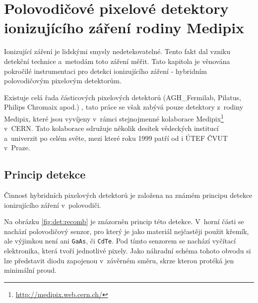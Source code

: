 

\chapter{Polovodičové pixelové detektory ionizujícího záření rodiny Medipix}\label{det}
Ionizující záření je lidskými smysly nedetekovatelné. Tento fakt dal vzniku detekční technice a~metodám toto záření měřit. Tato kapitola je věnována pokročilé instrumentaci pro detekci ionizujícího záření  - hybridním polovodičovým pixelovým detektorům.

Existuje celá řada částicových pixelových detektorů (AGH\_Fermilab, Pilatus, Philips Chromaix apod.) \cite{detectors_review}, tato práce se však zabývá pouze detektory z~rodiny Medipix, které jsou vyvíjeny v~rámci stejnojmenné kolaborace Medipix\footnote{\url{http://medipix.web.cern.ch/}} v~CERN. Tato kolaborace sdružuje několik desítek vědeckých institucí a~univerzit po celém světe, mezi které roku 1999 patří od i ÚTEF ČVUT v~Praze.


\clearpage

\section{Princip detekce}
Činnost hybridních pixelových detektorů je založena na známém principu detekce ionizujícího záření v~polovodiči. 

Na obrázku \ref{fig:det:recomb} je znázorněn princip této detekce. V~horní části se nachází polovodičový senzor, pro který je jako materiál nejčastěji použit křemík, ale výjimkou není ani \texttt{GaAs}, či \texttt{CdTe}. Pod tímto senzorem se nachází vyčítací elektronika, která tvoří jednotlivé pixely. Jako náhradní schéma tohoto obvodu si lze představit diodu zapojenou v~závěrném směru, skrze kterou protéká jen minimální proud. 

